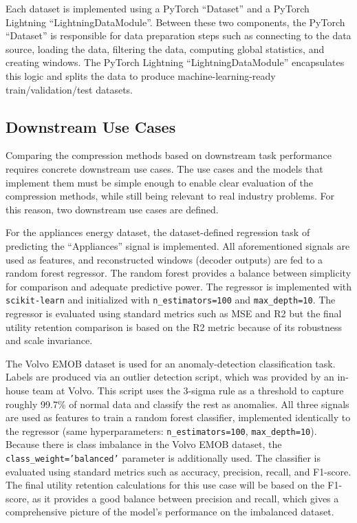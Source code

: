 Each dataset is implemented using a PyTorch ``Dataset'' and a PyTorch Lightning ``LightningDataModule''. Between these two components, the PyTorch ``Dataset'' is responsible for data preparation steps such as connecting to the data source, loading the data, filtering the data, computing global statistics, and creating windows. The PyTorch Lightning ``LightningDataModule'' encapsulates this logic and splits the data to produce machine-learning-ready train/validation/test datasets.

\subsection{Downstream Use Cases} 

Comparing the compression methods based on downstream task performance requires concrete downstream use cases. The use cases and the models that implement them must be simple enough to enable clear evaluation of the compression methods, while still being relevant to real industry problems. For this reason, two downstream use cases are defined.

For the appliances energy dataset, the dataset-defined regression task of predicting the ``Appliances'' signal is implemented. All aforementioned signals are used as features, and reconstructed windows (decoder outputs) are fed to a random forest regressor. The random forest provides a balance between simplicity for comparison and adequate predictive power. The regressor is implemented with \texttt{scikit-learn} and initialized with \texttt{n\_estimators=100} and \texttt{max\_depth=10}. The regressor is evaluated using standard metrics such as MSE and R2 but the final utility retention comparison is based on the R2 metric because of its robustness and scale invariance.

The Volvo EMOB dataset is used for an anomaly-detection classification task. Labels are produced via an outlier detection script, which was provided by an in-house team at Volvo. This script uses the 3-sigma rule as a threshold to capture roughly 99.7\% of normal data and classify the rest as anomalies. All three signals are used as features to train a random forest classifier, implemented identically to the regressor (same hyperparameters: \texttt{n\_estimators=100}, \texttt{max\_depth=10}). Because there is class imbalance in the Volvo EMOB dataset, the \texttt{class\_weight='balanced'} parameter is additionally used. The classifier is evaluated using standard metrics such as accuracy, precision, recall, and F1-score. The final utility retention calculations for this use case will be based on the F1-score, as it provides a good balance between precision and recall, which gives a comprehensive picture of the model's performance on the imbalanced dataset.

